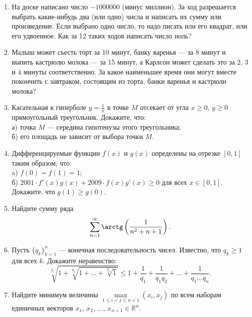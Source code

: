 \begin{enumerate}

\item На доске написано число $-1000000$ (минус миллион). За ход разрешается выбрать какие-нибудь два (или одно) числа и написать их сумму или произведение. Если выбрано одно число, то надо писать или его квадрат, или его удвоенное. Как за 12 таких ходов написать число ноль?

\item Малыш может съесть торт за 10 минут, банку варенья --- за 8 минут и выпить кастрюлю молока --- за 15 минут, а Карлсон может сделать это за 2, 3 и 4 минуты соответственно. За какое наименьшее время они могут вместе покончить с завтраком, состоящим из торта, банки варенья и кастрюли молока?

\item Касательная к гиперболе $y = \displaystyle\frac{1}{x}$ в точке $M$ отсекает от угла $x \geqslant 0$, $y \geqslant 0$ прямоугольный треугольник. Докажите, что:\\
а) точка $M$ --- середина гипотенузы этого треугольника;\\
б) его площадь не зависит от выбора точки $M$.

\item Дифференцируемые функции $f(x)$ и $g(x)$ определены на отрезке $[0, 1]$ таким образом, что:\\
a) $f(0)=f(1)=1$; \\
б) $2001\cdot f'(x) g(x) + 2009\cdot f(x) g'(x) \geqslant 0$ для всех $x \in [0, 1]$.\\
Докажите, что $g(1) \geqslant g(0)$.

\item Найдите сумму ряда
$$\sum_{n=1}^{\infty} \arctg \left( \frac{1}{n^2+n+1} \right).$$

\item Пусть $\{ q_k \}_{k=1}^{n}$ --- конечная последовательность чисел. Известно, что $q_k \geqslant 1$ для всех $k$. Докажите неравенство:
$$ \sqrt[q_1]{1 + \sqrt[q_2]{ 1 + \hdots + \sqrt[q_n]{1}}} \leqslant 1 + \frac{1}{q_1} + \frac{1}{q_1 q_2} + \hdots + \frac{1}{q_1 \hdots q_n}. $$

\item Найдите минимум величины $\max\limits_{1 \leqslant i < j \leqslant n+1} (x_i, x_j)$ по всем наборам единичных векторов $x_1$, $x_2$, ..., $x_{n+1} \in \mathbb{R}^n$.

\end{enumerate}
